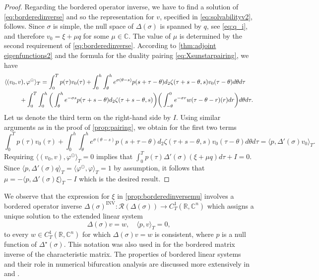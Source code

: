 \documentclass[english]{myarticle}
\DeclareMathOperator{\inv}{INV}
\begin{document}
\begin{sloppypar}
\begin{proposition}
\begin{proof}
Regarding the bordered operator inverse, we have to find a solution of \eqref{eq:borderedinverse} and so the representation for $v$, specified in \eqref{eq:solvabilityv2}, follows. Since $\sigma$ is simple, the null space of $\Delta(\sigma)$ is spanned by $q$, see \eqref{eq:q_i}, and therefore $v_0 = \xi + \mu q$ for some $\mu \in \mathbb{C}$. The value of $\mu$ is determined by the second requirement of \eqref{eq:borderedinverse}. According to \cref{thm:adjoint eigenfunctions2} and the formula for the duality pairing \eqref{eq:Xsunstarpairing}, we have
\begin{align*}
    \langle (v_0,v), \varphi^\odot \rangle_T &= \int_0^T p(\tau) v_0(\tau)  + \int_0^h \int_{\theta}^h e^{\sigma(\theta -s)}p(s+ \tau - \theta) d_2 \zeta(\tau  + s - \theta,s) v_0(\tau - \theta) d\theta d \tau \\
    &\hspace{-1.2cm}+ \int_0^T \int_0^h \bigg( \int_\theta^h e^{-\sigma s} p(\tau + s - \theta) d_2 \zeta(\tau  + s - \theta,s) \bigg) \bigg( \int_{-\theta}^0 e^{- \sigma r} w(\tau - \theta -r)(r) dr \bigg) d\theta d \tau.
\end{align*}
Let us denote the third term on the right-hand side by $I$. Using similar arguments as in the proof of \cref{prop:pairing}, we obtain for the first two terms
\begin{equation*}
    \int_0^T p(\tau) v_0(\tau)  + \int_0^h \int_{\theta}^h e^{\sigma(\theta -s)}p(s+ \tau - \theta) d_2 \zeta(\tau  + s - \theta,s) v_0(\tau - \theta) d\theta d \tau = \langle p, \Delta '(\sigma) v_0 \rangle_T.
\end{equation*}
Requiring $\langle (v_0,v), \varphi^\odot \rangle_T = 0$ implies that $\int_0^T p(\tau) \Delta '(\sigma)(\xi + \mu q) d\tau + I = 0$. Since $ \langle p, \Delta '(\sigma)q \rangle_T = \langle \varphi^\odot, \varphi \rangle_T = 1$ by assumption, it follows that $\mu = - \langle p, \Delta'(\sigma)\xi \rangle_T - I$ which is the desired result.
\end{proof}
\end{proposition}
We observe that the expression for $\xi$ in \cref{prop:borderedinversemu} involves a bordered operator inverse $\Delta(\sigma)^{\inv} : \mathcal{R}(\Delta(\sigma)) \to C_T^1(\mathbb{R},\mathbb{C}^n)$ which assigns a unique solution to the extended linear system
\begin{equation*}
    \Delta(\sigma)v = w, \quad \langle p,v\rangle_T = 0,
\end{equation*}
to every $w \in C_T^1(\mathbb{R},\mathbb{C}^n)$ for which $\Delta(\sigma)v = w$ is consistent, where $p$ is a null function of $\Delta^\star(\sigma)$. This notation was also used in \cite{Bosschaert2020,Bosschaert2024a,Janssens2010} for the bordered matrix inverse of the characteristic matrix. The properties of
bordered linear systems and their role in numerical bifurcation analysis are discussed more extensively in \cite{Keller1987,Kuznetsov2023a} and \cite[Chapter 3]{Govaerts2000}.


\end{sloppypar}
\end{document}
